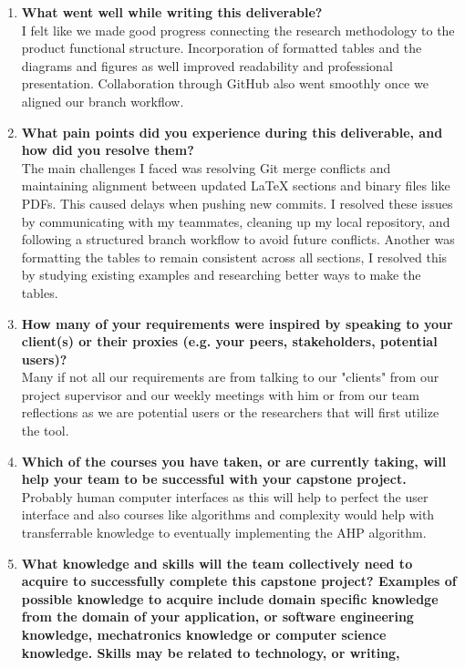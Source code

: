 \begin{enumerate}
  \item \textbf{What went well while writing this deliverable?} \\
  I felt like we made good progress connecting the research methodology to the product functional structure. Incorporation of formatted tables and the diagrams and figures as well improved readability and professional presentation. Collaboration through GitHub also went smoothly once we aligned our branch workflow. 
  \item \textbf{What pain points did you experience during this deliverable, and how did
  you resolve them?} \\
  The main challenges I faced was resolving Git merge conflicts and maintaining alignment between updated LaTeX sections and binary files like PDFs. This caused delays when pushing new commits. I resolved these issues by communicating with my teammates, cleaning up my local repository, and following a structured branch workflow to avoid future conflicts. Another was formatting the tables to remain consistent across all sections, I resolved this by studying existing examples and researching better ways to make the tables.
  \item \textbf{How many of your requirements were inspired by speaking to your
  client(s) or their proxies (e.g. your peers, stakeholders, potential users)?} \\
  Many if not all our requirements are from talking to our "clients" from our project supervisor and our weekly meetings with him or from our team reflections as we are potential users or the researchers that will first utilize the tool.
  \item \textbf{Which of the courses you have taken, or are currently taking, will help
  your team to be successful with your capstone project.} \\
  Probably human computer interfaces as this will help to perfect the user interface and also courses like algorithms and complexity would help with transferrable knowledge to eventually implementing the AHP algorithm.
  \item \textbf{What knowledge and skills will the team collectively need to acquire to
  successfully complete this capstone project?  Examples of possible knowledge
  to acquire include domain specific knowledge from the domain of your
  application, or software engineering knowledge, mechatronics knowledge or
  computer science knowledge.  Skills may be related to technology, or writing,
}
\end{enumerate}
